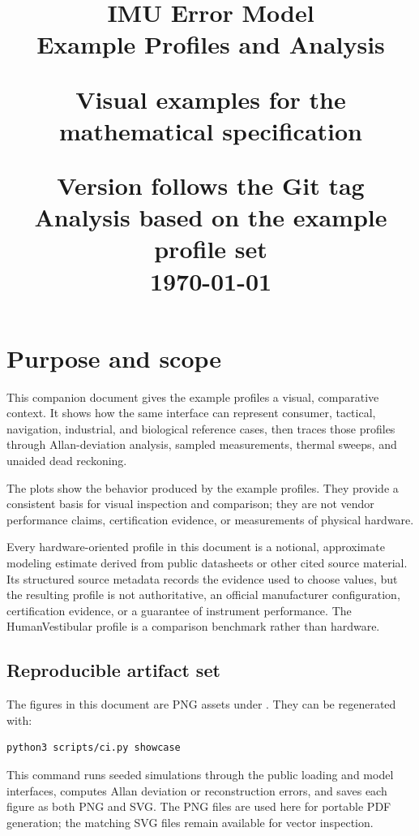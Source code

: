 \documentclass[11pt,oneside,headings=big]{scrreprt}
\title{%
    \vspace*{1.2cm}
    {\color{ImuNavy}\Huge\bfseries IMU Error Model\\[0.25em]
    \color{ImuBlue}\Large Example Profiles and Analysis}\par
    \vspace{1.0cm}
    \color{ImuSlate}\large Visual examples for the mathematical specification\par
    \vfill
    \color{ImuSlate}\normalsize Version follows the Git tag\\
    Analysis based on the example profile set\\
    \today
}
\author{}
\date{}
\begin{document}
    \maketitle
    \tableofcontents


    \chapter{Purpose and scope}

    This companion document gives the example profiles a visual, comparative
    context. It shows how the same  interface can represent
    consumer, tactical, navigation, industrial, and biological reference cases,
    then traces those profiles through Allan-deviation analysis, sampled
    measurements, thermal sweeps, and unaided dead reckoning.

    The plots show the behavior produced by the example profiles. They provide a
    consistent basis for visual inspection and comparison; they are not vendor
    performance claims, certification evidence, or measurements of physical
    hardware.

    \begin{notionalbox}
        Every hardware-oriented profile in this document is a notional, approximate
        modeling estimate derived from public datasheets or other cited source material.
        Its structured source metadata records the evidence used to choose values, but
        the resulting profile is not authoritative, an official manufacturer
        configuration, certification evidence, or a guarantee of instrument
        performance. The HumanVestibular profile is a comparison benchmark rather than
        hardware.
    \end{notionalbox}


    \section{Reproducible artifact set}

    The figures in this document are PNG assets under
    . They can be regenerated with:

    \begin{verbatim}
python3 scripts/ci.py showcase
    \end{verbatim}

    This command runs seeded simulations through the public loading and model
    interfaces, computes Allan deviation or reconstruction errors, and saves each
    figure as both PNG and SVG. The PNG files are used here for portable PDF
    generation; the matching SVG files remain available for vector inspection.
\end{document}
